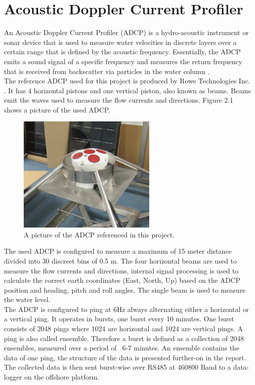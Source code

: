 \section{Acoustic Doppler Current Profiler}
An Acoustic Doppler Current Profiler (ADCP) is a hydro-acoustic instrument or sonar device that is used to measure water velocities in discrete layers over a certain range that is defined by the acoustic frequency. Essentially, the ADCP emits a sound signal of a specific frequency and measures the return frequency that is received from backscatter via particles in the water column \cite{adcp_def}.\\
The reference ADCP used for this project is produced by Rowe Technologies Inc. \cite{rowe}. It has 4 horizontal pistons and one vertical piston, also known as beams. Beams emit the waves used to measure the flow currents and directions. Figure 2.1 shows a picture of the used ADCP.\\
\begin{figure}[h]
\centering
      \includegraphics[width=0.6\textwidth]{adcp}
        \caption{A picture of the ADCP referenced in this project. }
\end{figure}
The used ADCP is configured to measure a maximum of 15 meter distance divided into 30 discreet bins of 0.5 m. The four horizontal beams are used to measure the flow currents and directions, internal signal processing is used to calculate the correct earth coordinates (East, North, Up) based on the ADCP position and heading, pitch and roll angles. The single beam is used to measure the water level.\\
The ADCP is configured to ping at 6Hz always alternating either a horizontal or a vertical ping. It operates in bursts, one burst every 10 minutes. One burst consists of 2048 pings where 1024 are horizontal and 1024 are vertical pings. A ping is also called ensemble. Therefore a burst is defined as a collection of 2048 ensembles, measured over a period of ~6-7 minutes. An ensemble contains the data of one ping, the structure of the data is presented further-on in the report. The collected data is then sent burst-wise over RS485 at 460800 Baud to a data-logger on the offshore platform.

